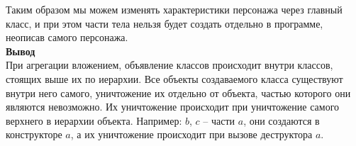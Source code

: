 \documentclass[12pt]{report}
\begin{document}
    Таким образом мы можем изменять характеристики персонажа через главный класс, и при этом части тела нельзя будет создать отдельно в программе, неописав самого персонажа.\\
    \textbf{Вывод}\\
    При агрегации вложением, объявление классов происходит внутри классов, стоящих выше их по иерархии. 
    Все объекты создаваемого класса существуют внутри него самого, уничтожение их отдельно от объекта, 
    частью которого они являются невозможно. Их уничтожение происходит при уничтожение самого верхнего в иерархии объекта. 
    Например: $b$, $c$ – части $a$, они создаются в конструкторе $a$, а их уничтожение происходит при вызове деструктора $a$.\\
\end{document}
